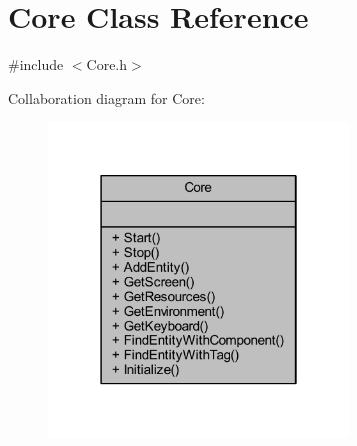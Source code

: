 \hypertarget{class_core}{}\section{Core Class Reference}
\label{class_core}


{\ttfamily \#include $<$Core.\+h$>$}



Collaboration diagram for Core\+:
\nopagebreak
\begin{figure}[H]
\begin{center}
\leavevmode
\includegraphics[width=226pt]{class_core__coll__graph}
\end{center}
\end{figure}
